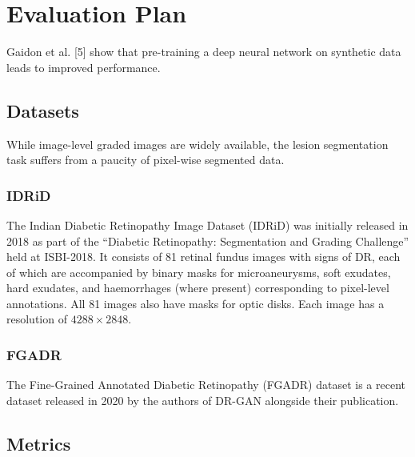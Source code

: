 \chapter{Evaluation Plan}
 Gaidon et al. [5] show that pre-training a deep
neural network on synthetic data leads to improved performance. 
\section{Datasets}

While image-level graded images are widely available, the lesion segmentation task suffers from a paucity of pixel-wise segmented data.

\subsection{IDRiD}

The Indian Diabetic Retinopathy Image Dataset (IDRiD) \cite{Porwal2018} was initially released in 2018 as part of the ``Diabetic Retinopathy: Segmentation and Grading Challenge'' held at ISBI-2018. It consists of 81 retinal fundus images with signs of DR, each of which are accompanied by binary masks for microaneurysms, soft exudates, hard exudates, and haemorrhages (where present) corresponding to pixel-level annotations. All 81 images also have masks for optic disks. Each image has a resolution of $4288\times 2848$.

\subsection{FGADR}

The Fine-Grained Annotated Diabetic Retinopathy (FGADR) \cite{9257400} dataset is a recent dataset released in 2020 by the authors of DR-GAN alongside their publication.

\section{Metrics}